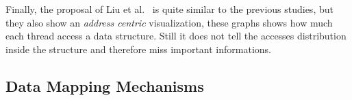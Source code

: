 Finally, the proposal of Liu et al.~\cite{Liu14Tool} is quite similar to the previous studies, but
they also show an \emph{address centric} visualization, these graphs shows how
much each thread access a data structure. Still it does not tell the
accesses distribution inside the structure and therefore miss
important informations.


\subsection{Data Mapping Mechanisms}
\label{sec:soa-mapping}

%
%    

